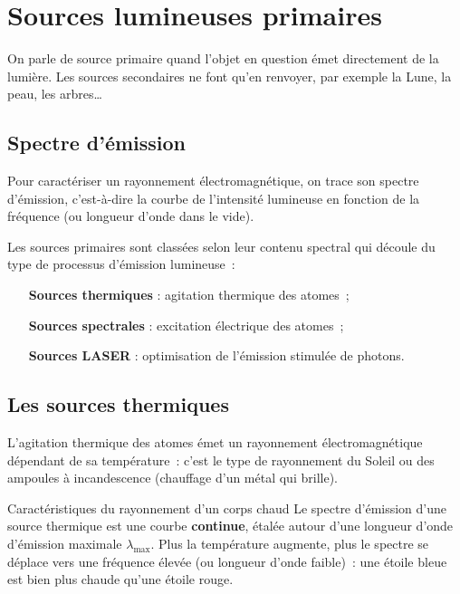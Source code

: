 \documentclass[../main/main.tex]{subfiles}
\begin{document}
\section{Sources lumineuses primaires}

On parle de source primaire quand l'objet en question émet directement de la
lumière. Les sources secondaires ne font qu'en renvoyer, par exemple la Lune, la
peau, les arbres…

\subsection{Spectre d'émission}

Pour caractériser un rayonnement électromagnétique, on trace son spectre
d'émission, c'est-à-dire la courbe de l'intensité lumineuse en fonction de la
fréquence (ou longueur d'onde dans le vide).

Les sources primaires sont classées selon leur contenu spectral
qui découle du type de processus d'émission lumineuse~:
\begin{itemize}[leftmargin=120pt]
    \item[\textbf{Sources thermiques}] : agitation thermique des atomes~;
    \item[\textbf{Sources spectrales}] : excitation électrique des atomes~;
    \item[\textbf{Sources LASER}] : optimisation de l'émission stimulée de photons.
\end{itemize}

\subsection{Les sources thermiques}

L'agitation thermique des atomes émet un rayonnement électromagnétique dépendant
de sa température~: c'est le type de rayonnement du Soleil ou des ampoules à
incandescence (chauffage d'un métal qui brille).

\begin{NCdefi}[]{Caractéristiques du rayonnement d'un corps chaud}
    Le spectre d'émission d'une source thermique est une courbe
    \textbf{continue}, étalée autour d'une longueur d'onde d'émission maximale
    $\lambda_{\max}$. Plus la température augmente, plus le spectre se déplace vers
    une fréquence élevée (ou longueur d'onde faible)~: une étoile bleue est bien
    plus chaude qu'une étoile rouge.
\end{NCdefi}
\end{document}
